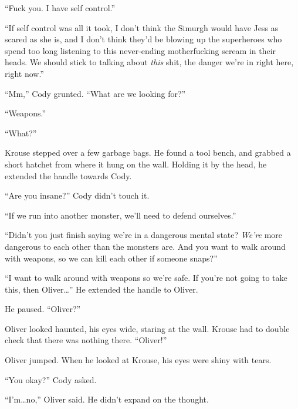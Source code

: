 ``Fuck you.  I have self control.''



``If self control was all it took, I don't think the Simurgh would have Jess as scared as she is, and I don't think they'd be blowing up the superheroes who spend too long listening to this never-ending motherfucking scream in their heads.  We should stick to talking about \emph{this} shit, the danger we're in right here, right now.''



``Mm,'' Cody grunted.  ``What are we looking for?''



``Weapons.''



``What?''



Krouse stepped over a few garbage bags.  He found a tool bench, and grabbed a short hatchet from where it hung on the wall.  Holding it by the head, he extended the handle towards Cody.



``Are you insane?'' Cody didn't touch it.



``If we run into another monster, we'll need to defend ourselves.''



``Didn't you just finish saying we're in a dangerous mental state?  \emph{We're} more dangerous to each other than the monsters are.  And you want to walk around with weapons, so we can kill each other if someone snaps?''



``I want to walk around with weapons so we're safe.  If you're not going to take this, then Oliver\ldots''  He extended the handle to Oliver.



He paused.  ``Oliver?''



Oliver looked haunted, his eyes wide, staring at the wall.  Krouse had to double check that there was nothing there.  ``Oliver!''



Oliver jumped.  When he looked at Krouse, his eyes were shiny with tears.



``You okay?''  Cody asked.



``I'm\ldots no,'' Oliver said.  He didn't expand on the thought.



